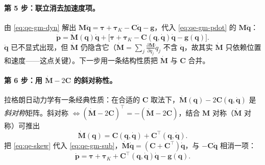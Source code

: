 \paragraph{第 5 步：联立消去加速度项。}
由 \cref{eq:qe-gm-dyn} 解出 $\mathbf{M}\ddot{\boldsymbol q}=\boldsymbol\tau+\boldsymbol\tau_K-\mathbf{C}\dot{\boldsymbol q}-\boldsymbol g$，代入 \cref{eq:qe-gm-pdot} 的 $\mathbf{M}\ddot{\boldsymbol q}$：
\begin{equation}
  \dot{\boldsymbol p} = \dot{\mathbf{M}}(\boldsymbol q)\dot{\boldsymbol q} + \big[\boldsymbol\tau + \boldsymbol\tau_K - \mathbf{C}(\boldsymbol q,\dot{\boldsymbol q})\dot{\boldsymbol q} - \boldsymbol g(\boldsymbol q)\big].
  \label{eq:qe-gm-sub}
\end{equation}
$\ddot{\boldsymbol q}$ 已不显式出现，但 $\dot{\mathbf{M}}$ 仍隐含它（$\dot{\mathbf{M}}=\sum_j\frac{\partial\mathbf{M}}{\partial q_j}\dot q_j$ 不含 $\ddot{\boldsymbol q}$，故其实 $\dot{\mathbf{M}}$ 只依赖位置和速度——这点关键）。下一步用一条结构性质把 $\dot{\mathbf{M}}$ 与 $\mathbf{C}$ 合并。

\paragraph{第 6 步：用 $\dot{\mathbf{M}}-2\mathbf{C}$ 的斜对称性。}
拉格朗日动力学有一条经典性质：在合适的 $\mathbf{C}$ 取法下，$\dot{\mathbf{M}}(\boldsymbol q)-2\mathbf{C}(\boldsymbol q,\dot{\boldsymbol q})$ 是\emph{斜对称}矩阵。斜对称 $\Leftrightarrow(\dot{\mathbf{M}}-2\mathbf{C})^\top=-(\dot{\mathbf{M}}-2\mathbf{C})$，结合 $\mathbf{M}$ 对称（$\dot{\mathbf{M}}$ 对称）可推出
\begin{equation}
  \dot{\mathbf{M}}(\boldsymbol q) = \mathbf{C}(\boldsymbol q,\dot{\boldsymbol q}) + \mathbf{C}^\top(\boldsymbol q,\dot{\boldsymbol q}).
  \label{eq:qe-skew}
\end{equation}
把 \cref{eq:qe-skew} 代入 \cref{eq:qe-gm-sub}，$\dot{\mathbf{M}}\dot{\boldsymbol q}=(\mathbf{C}+\mathbf{C}^\top)\dot{\boldsymbol q}$，与 $-\mathbf{C}\dot{\boldsymbol q}$ 相消一项：
\begin{equation}
  \boxed{\;\dot{\boldsymbol p} = \boldsymbol\tau + \boldsymbol\tau_K + \mathbf{C}^\top(\boldsymbol q,\dot{\boldsymbol q})\dot{\boldsymbol q} - \boldsymbol g(\boldsymbol q).\;}
  \label{eq:qe-gm-final}
\end{equation}

